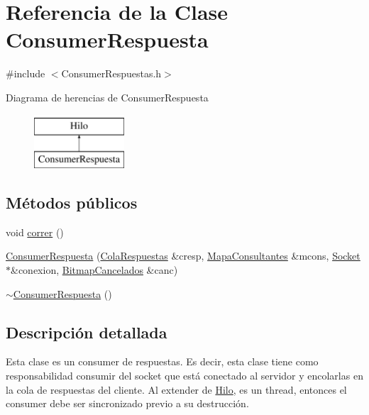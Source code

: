 \hypertarget{classConsumerRespuesta}{\section{\-Referencia de la \-Clase \-Consumer\-Respuesta}
\label{classConsumerRespuesta}
}


{\ttfamily \#include $<$\-Consumer\-Respuestas.\-h$>$}

\-Diagrama de herencias de \-Consumer\-Respuesta\begin{figure}[H]
\begin{center}
\leavevmode
\includegraphics[height=2.000000cm]{classConsumerRespuesta}
\end{center}
\end{figure}
\subsection*{\-Métodos públicos}
\begin{DoxyCompactItemize}
\item 
void \hyperlink{classConsumerRespuesta_a889f4526b5a31e66dfb6eee67552b811}{correr} ()
\item 
\hyperlink{classConsumerRespuesta_a57a2200960ca9cc78a50b2a7188c7970}{\-Consumer\-Respuesta} (\hyperlink{classBLQueue}{\-Cola\-Respuestas} \&cresp, \hyperlink{classBLMap}{\-Mapa\-Consultantes} \&mcons, \hyperlink{classSocket}{\-Socket} $\ast$\&conexion, \hyperlink{classBLMap}{\-Bitmap\-Cancelados} \&canc)
\item 
\hyperlink{classConsumerRespuesta_a6ac047284f3e870a6404b1d77bec88a5}{$\sim$\-Consumer\-Respuesta} ()
\end{DoxyCompactItemize}


\subsection{\-Descripción detallada}
\-Esta clase es un consumer de respuestas. \-Es decir, esta clase tiene como responsabilidad consumir del socket que está conectado al servidor y encolarlas en la cola de respuestas del cliente. \-Al extender de \hyperlink{classHilo}{\-Hilo}, es un thread, entonces el consumer debe ser sincronizado previo a su destrucción. 

